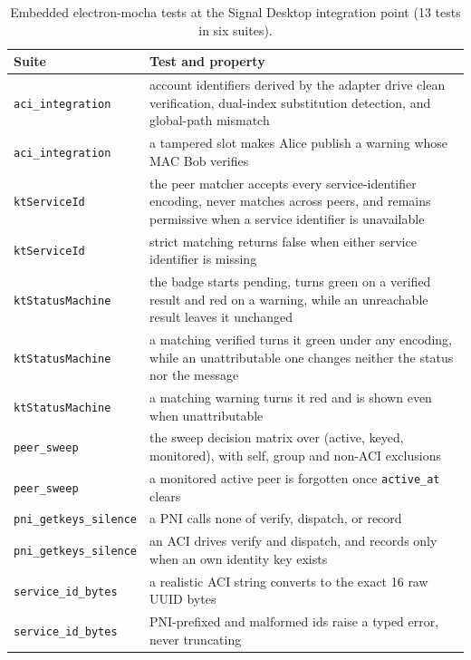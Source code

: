 \begin{table}[H]
\centering
\caption{Embedded electron-mocha tests at the Signal Desktop integration point (\num{13} tests in
six suites).}
\label{tab:tests-embedded}
\footnotesize
\begin{tabular}{@{}l>{\raggedright\arraybackslash}p{9.2cm}@{}}
\toprule
Suite & Test and property \\
\midrule
\texttt{aci\_integration} & account identifiers derived by the adapter drive clean verification, dual-index substitution detection, and global-path mismatch \\
\texttt{aci\_integration} & a tampered slot makes Alice publish a warning whose MAC Bob verifies \\
\midrule
\texttt{ktServiceId} & the peer matcher accepts every service-identifier encoding, never matches across peers, and remains permissive when a service identifier is unavailable \\
\texttt{ktServiceId} & strict matching returns false when either service identifier is missing \\
\midrule
\texttt{ktStatusMachine} & the badge starts pending, turns green on a verified result and red on a warning, while an unreachable result leaves it unchanged \\
\texttt{ktStatusMachine} & a matching verified turns it green under any encoding, while an unattributable one changes neither the status nor the message \\
\texttt{ktStatusMachine} & a matching warning turns it red and is shown even when unattributable \\
\midrule
\texttt{peer\_sweep} & the sweep decision matrix over (active, keyed, monitored), with self, group and non-ACI exclusions \\
\texttt{peer\_sweep} & a monitored active peer is forgotten once \texttt{active\_at} clears \\
\midrule
\texttt{pni\_getkeys\_silence} & a PNI calls none of verify, dispatch, or record \\
\texttt{pni\_getkeys\_silence} & an ACI drives verify and dispatch, and records only when an own identity key exists \\
\midrule
\texttt{service\_id\_bytes} & a realistic ACI string converts to the exact 16 raw UUID bytes \\
\texttt{service\_id\_bytes} & PNI-prefixed and malformed ids raise a typed error, never truncating \\
\bottomrule
\end{tabular}
\end{table}

